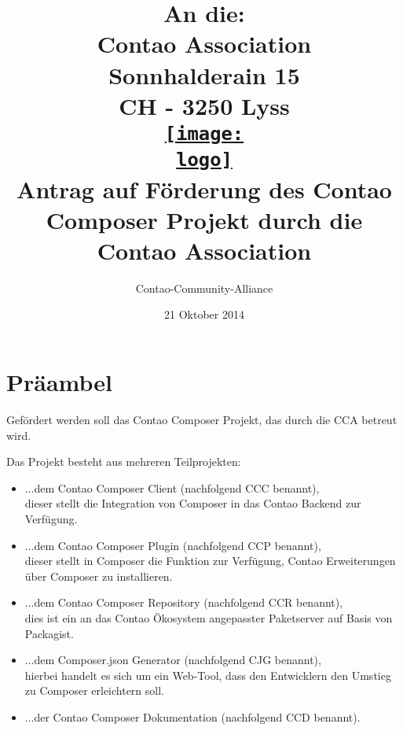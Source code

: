 \documentclass[
paper=a4,
draft=false,%
fontsize=10pt%
]{scrartcl}
\def\logo{logos/colorlogo_rgb}%
\begin{document}
\title{%
An die:\\
Contao Association\\
Sonnhalderain 15\\
CH - 3250 Lyss\\
\href{http://c-c-a.org}{\texttt{[image: \\logo]}}\\
Antrag auf Förderung des Contao Composer Projekt durch die Contao Association\\%
}
\date{21 Oktober 2014}
\author{Contao-Community-Alliance}
\maketitle

\pagebreak

%
%

\newpage

\section{Präambel}

Gefördert werden soll das Contao Composer Projekt, das durch die CCA betreut wird.

Das Projekt besteht aus mehreren Teilprojekten:

\begin{itemize}
\item ...dem Contao Composer Client (nachfolgend CCC benannt), \\
dieser stellt die Integration von Composer in das Contao Backend zur Verfügung.
\item ...dem Contao Composer Plugin (nachfolgend CCP benannt), \\
dieser stellt in Composer die Funktion zur Verfügung, Contao Erweiterungen über Composer zu installieren.
\item ...dem Contao Composer Repository (nachfolgend CCR benannt), \\
dies ist ein an das Contao Ökosystem angepasster Paketserver auf Basis von Packagist.
\item ...dem Composer.json Generator (nachfolgend CJG benannt), \\
hierbei handelt es sich um ein Web-Tool, dass den Entwicklern den Umstieg zu Composer erleichtern soll.
\item ...der Contao Composer Dokumentation (nachfolgend CCD benannt).
\end{itemize}
\end{document}
